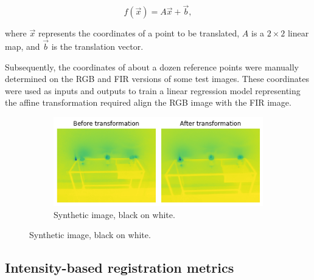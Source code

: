 \documentclass{l4proj}
\begin{document}
\begin{equation}
  f(\vec{x}) = A \vec{x} + \vec{b},
\end{equation}

where $\vec{x}$ represents the coordinates of a point to be translated, $A$ is a $2 \times 2$ linear map, and $\vec{b}$ is the translation vector.

Subsequently, the coordinates of about a dozen reference points were manually determined on the RGB and FIR versions of some test images. These coordinates were used as inputs and outputs to train a linear regression model representing the affine transformation required align the RGB image with the FIR image. 



\begin{figure}[h]
  \centering
  \begin{subfigure}[h!]{0.9\textwidth}
    \includegraphics[width=\textwidth]{images/registration/linear_model_alignment.png}
    \caption{Synthetic image, black on white.}
    \label{fig:linear_trans_before_after}
  \end{subfigure}
\end{figure}

\subsection{Intensity-based registration metrics}
\end{document}
